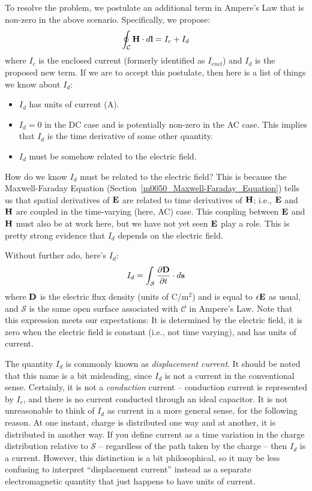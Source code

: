 To resolve the problem, we postulate an additional term in Ampere's Law that is non-zero in the above scenario.
Specifically, we propose:
%
\begin{equation}   
\oint_{\mathcal{C}}{ {\bf H} \cdot d{\bf l} } = I_c + I_d 
\end{equation}
%
where $I_c$ is the enclosed current (formerly identified as $I_{encl}$) and $I_d$ is the proposed new term.
If we are to accept this postulate, then here is a list of things we know about $I_d$:
%
\begin{itemize}
\item $I_d$ has units of current (A).
\item $I_d=0$ in the DC case and is potentially non-zero in the AC case.  This implies that $I_d$ is the time derivative of some other quantity.
\item $I_d$ must be somehow related to the electric field.
\end{itemize}
%
How do we know $I_d$ must be related to the electric field? This is because the Maxwell-Faraday Equation 
(Section~\ref{m0050_Maxwell-Faraday_Equation}) tells us that spatial derivatives of ${\bf E}$ are related to time derivatives of ${\bf H}$; i.e., ${\bf E}$ and ${\bf H}$ are coupled in the time-varying (here, AC) case.  
This coupling between ${\bf E}$ and ${\bf H}$ must also be at work here, but we have not yet seen ${\bf E}$ play a role.  This is pretty strong evidence that $I_d$ depends on the electric field.

Without further ado, here's $I_d$:
%
\begin{equation}   
I_d = \int_{\mathcal{S}} { \frac{\partial {\bf D}}{\partial t} \cdot d{\bf s} }
\end{equation}
%
where ${\bf D}$ is the electric flux density (units of C/m$^2$) and is equal to $\epsilon{\bf E}$ as usual,
and $\mathcal{S}$ is the same open surface associated with $\mathcal{C}$ in Ampere's Law.
Note that this expression meets our expectations:
It is determined by the electric field, it is zero when the electric field is constant (i.e., not time varying), and has units of current.

The quantity $I_d$ is commonly known as \emph{displacement current}.
It should be noted that this name is a bit misleading, since $I_d$ is not a current in the conventional sense.
Certainly, it is not a \emph{conduction} current -- conduction current is represented by $I_c$, and there is no current conducted through an ideal capacitor.
It is not unreasonable to think of $I_d$ as current in a more general sense, for the following reason.  At one instant, charge is distributed one way and at another, it is distributed in another way.  If you define current as a time variation in the charge distribution relative to $\mathcal{S}$ -- regardless of the path taken by the charge -- then $I_d$ is a current.
However, this distinction is a bit philosophical, so it may be less confusing to interpret ``displacement current'' instead as a separate electromagnetic quantity that just happens to have units of current.

